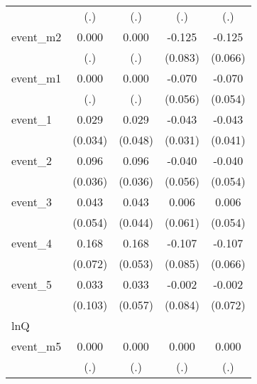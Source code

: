 {\begin{tabular}{l*{4}{c}}
            &         (.)         &         (.)         &         (.)         &         (.)         \\
[1em]
event\_m2    &       0.000         &       0.000         &      -0.125         &      -0.125         \\
            &         (.)         &         (.)         &     (0.083)         &     (0.066)         \\
[1em]
event\_m1    &       0.000         &       0.000         &      -0.070         &      -0.070         \\
            &         (.)         &         (.)         &     (0.056)         &     (0.054)         \\
[1em]
event\_1     &       0.029         &       0.029         &      -0.043         &      -0.043         \\
            &     (0.034)         &     (0.048)         &     (0.031)         &     (0.041)         \\
[1em]
event\_2     &       0.096\sym{**} &       0.096\sym{**} &      -0.040         &      -0.040         \\
            &     (0.036)         &     (0.036)         &     (0.056)         &     (0.054)         \\
[1em]
event\_3     &       0.043         &       0.043         &       0.006         &       0.006         \\
            &     (0.054)         &     (0.044)         &     (0.061)         &     (0.054)         \\
[1em]
event\_4     &       0.168\sym{*}  &       0.168\sym{**} &      -0.107         &      -0.107         \\
            &     (0.072)         &     (0.053)         &     (0.085)         &     (0.066)         \\
[1em]
event\_5     &       0.033         &       0.033         &      -0.002         &      -0.002         \\
            &     (0.103)         &     (0.057)         &     (0.084)         &     (0.072)         \\
\hline
lnQ         &                     &                     &                     &                     \\
event\_m5    &       0.000         &       0.000         &       0.000         &       0.000         \\
            &         (.)         &         (.)         &         (.)         &         (.)         \\

\end{tabular}}
